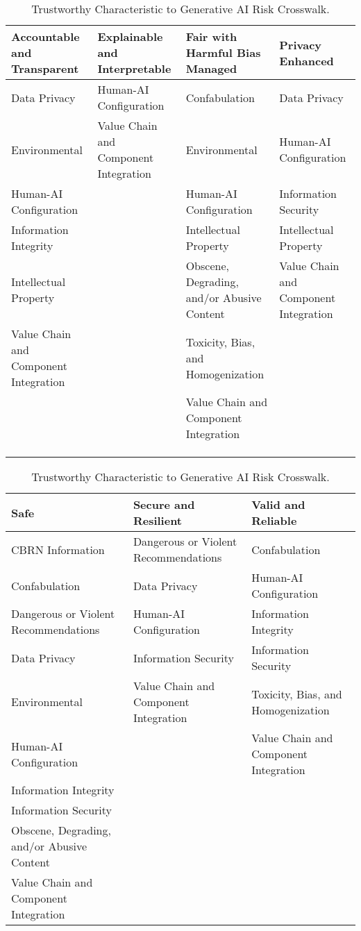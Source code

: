 \documentclass[fleqn]{article}
\begin{document}
\begin{landscape}
\begin{table}[H]
	\caption{Trustworthy Characteristic to Generative AI Risk Crosswalk.}
	\label{tab:tc_to_gai_risk_cw}
	\footnotesize
	\begin{tabular}{llll}
		\toprule
		Accountable and Transparent & Explainable and Interpretable & Fair with Harmful Bias Managed & Privacy Enhanced \\
		\midrule
		Data Privacy & Human-AI Configuration & Confabulation & Data Privacy \\
		Environmental & Value Chain and Component Integration & Environmental & Human-AI Configuration \\
		Human-AI Configuration &  & Human-AI Configuration & Information Security \\
		Information Integrity &  & Intellectual Property & Intellectual Property \\
		Intellectual Property &  & Obscene, Degrading, and/or Abusive Content & Value Chain and Component Integration \\
		Value Chain and Component Integration &  & Toxicity, Bias, and Homogenization &  \\
 		&  & Value Chain and Component Integration &  \\
 		&  &  &  \\
 		&  &  &  \\
 		&  &  &  \\
		\bottomrule
	\end{tabular}
	\newline
	\vspace{10pt}
	\newline
	\begin{tabular}{lll}
		\toprule
		Safe & Secure and Resilient & Valid and Reliable \\
		\midrule
		CBRN Information & Dangerous or Violent Recommendations & Confabulation \\
		Confabulation & Data Privacy & Human-AI Configuration \\
		Dangerous or Violent Recommendations & Human-AI Configuration & Information Integrity \\
		Data Privacy & Information Security & Information Security \\
		Environmental & Value Chain and Component Integration & Toxicity, Bias, and Homogenization \\
		Human-AI Configuration &  & Value Chain and Component Integration \\
		Information Integrity &  &  \\
		Information Security &  &  \\
		Obscene, Degrading, and/or Abusive Content &  &  \\
		Value Chain and Component Integration &  &  \\
		\bottomrule
	\end{tabular}
\end{table}
\vfill
\raisebox{-10pt}{\makebox[\linewidth]{\thepage}}
\end{landscape}
\end{document}
